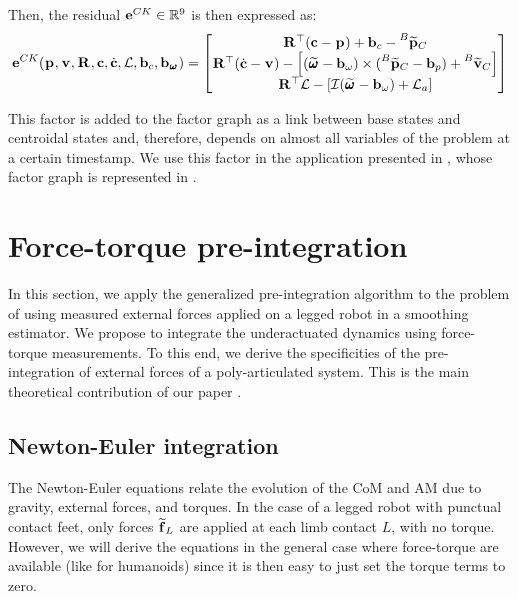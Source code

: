 Then, the residual ${\bf e}^{CK} \in \mathbb{R}^9$ is then expressed as:
%
\begin{equation}
    {\bf e}^{CK}(\prescript{}{}{{\bf p}}_{}, \prescript{}{}{{\bf v}}_{}, \prescript{}{}{{\bf R}}_{}, {\bf c}, \dot{{\bf c}}, \mathcal{L}, {\bf b}_c, {\bf b}_{\prescript{}{}{\pmb{\omega}}_{}})=
    \begin{bmatrix}
        \prescript{}{}{{\bf R}}_{}^{\top}({\bf c} - \prescript{}{}{{\bf p}}_{}) + {\bf b}_{c} - \prescript{B}{}{\widetilde{{\bf p}}}_{C}
        \\
        \prescript{}{}{{\bf R}}_{}^{\top}(\dot{{\bf c}} - \prescript{}{}{{\bf v}}_{}) - \left[(\prescript{}{}{\widetilde{\pmb{\omega}}}_{} - {\bf b}_{\omega}) \times (\prescript{B}{}{\widetilde{{\bf p}}}_{C} -  {\bf b}_{p}) + \prescript{B}{}{\widetilde{{\bf v}}}_{C} \right]
        \\
        \prescript{}{}{{\bf R}}_{}^{\top}\mathcal{L} - \left[\mathcal{I} (\prescript{}{}{\widetilde{\pmb{\omega}}}_{} - {\bf b}_{\omega}) + \mathcal{L}_a \right]
    \end{bmatrix}
    \label{eq:CK_residual}
\end{equation}

This factor is added to the factor graph as a link between base states and centroidal states and, therefore, depends on almost all variables of the problem
at a certain timestamp. We use this factor in the application presented in , whose factor graph is represented in 
.



\section{Force-torque pre-integration}
In this section, we apply the generalized pre-integration algorithm to the problem of using measured external
forces applied on a legged robot in a smoothing estimator. We propose to integrate the underactuated dynamics  using force-torque measurements.
To this end, we derive the specificities of the pre-integration of external forces of a poly-articulated system. This is the main theoretical contribution
of our paper \cite{fourmy2021contact}.

\subsection{Newton-Euler integration}
The Newton-Euler equations  relate the evolution of the CoM and AM due to gravity, external forces, and torques. 
In the case of a legged robot with punctual contact feet, only forces $\prescript{}{}{\widetilde{{\bf f}}}_{L}$ are applied at each limb contact $L$, with no torque. 
However, we will derive the equations in the general case where force-torque are available (like for humanoids) since it is then easy to just set the 
torque terms to zero.

